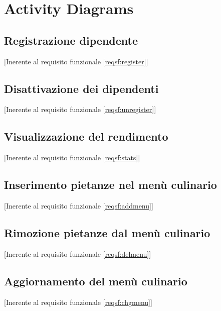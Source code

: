 

	\section{Activity Diagrams}
	\subsection{Registrazione dipendente}[Inerente al requisito funzionale \ref{reqsf:register}]

	\newpage\subsection{Disattivazione dei dipendenti}[Inerente al requisito funzionale \ref{reqsf:unregister}]

	\newpage\subsection{Visualizzazione del rendimento}[Inerente al requisito funzionale \ref{reqsf:stats}]

	\newpage\subsection{Inserimento pietanze nel menù culinario}[Inerente al requisito funzionale \ref{reqsf:addmenu}]

	\newpage\subsection{Rimozione pietanze dal menù culinario}[Inerente al requisito funzionale \ref{reqsf:delmenu}]

	\newpage\subsection{Aggiornamento del menù culinario}[Inerente al requisito funzionale \ref{reqsf:chgmenu}]

